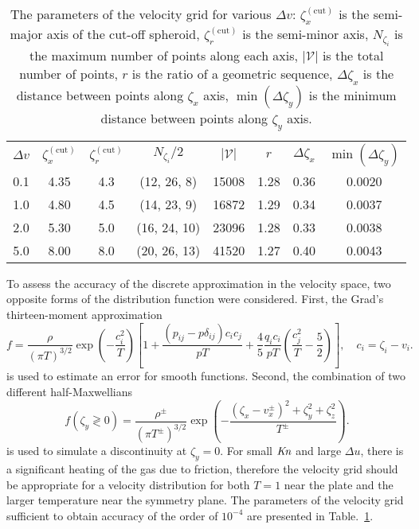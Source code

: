 \documentclass[review]{elsarticle}
\newcommand{\Kn}{\mbox{\textit{Kn}}}
\begin{document}
\begin{table}
    \centering
    \begin{tabular}{cccccccc}
        \(\Delta{v}\) & \(\zeta^{(\mathrm{cut})}_x\) & \(\zeta^{(\mathrm{cut})}_r\)
            & \(N_{\zeta_i}/2\) & \(|\mathcal{V}|\) & \(r\) & \(\Delta\zeta_x\) & \(\min(\Delta\zeta_y)\) \\[3pt]
        0.1 & 4.35 & 4.3 & (12, 26, 8)  & 15008 & 1.28 & 0.36 & 0.0020 \\
        1.0 & 4.80 & 4.5 & (14, 23, 9)  & 16872 & 1.29 & 0.34 & 0.0037 \\
        2.0 & 5.30 & 5.0 & (16, 24, 10) & 23096 & 1.28 & 0.33 & 0.0038 \\
        5.0 & 8.00 & 8.0 & (20, 26, 13) & 41520 & 1.27 & 0.40 & 0.0043 \\
    \end{tabular}
    \caption{The parameters of the velocity grid for various \(\Delta{v}\):
        \(\zeta^{(\mathrm{cut})}_x\) is the semi-major axis of the cut-off spheroid,
        \(\zeta^{(\mathrm{cut})}_r\) is the semi-minor axis,
        \(N_{\zeta_i}\) is the maximum number of points along each axis,
        \(|\mathcal{V}|\) is the total number of points,
        \(r\) is the ratio of a geometric sequence,
        \(\Delta\zeta_x\) is the distance between points along \(\zeta_x\) axis,
        \(\min(\Delta\zeta_y)\) is the minimum distance between points along \(\zeta_y\) axis.}
    \label{table:velocity_grid}
\end{table}

To assess the accuracy of the discrete approximation in the velocity space,
two opposite forms of the distribution function were considered.
First, the Grad's thirteen-moment approximation
\begin{equation}\label{eq:grad13}
    f = \frac{\rho}{(\pi T)^{3/2}}\exp\left(-\frac{c_i^2}{ T}\right)
    \left[ 1 + \frac{(p_{ij}-p\delta_{ij})c_ic_j}{pT} + \frac4{5}\frac{q_ic_i}{pT}\left(\frac{c_j^2}{T}-\frac5{2}\right) \right],
    \quad c_i = \zeta_i - v_i.
\end{equation}
is used to estimate an error for smooth functions.
Second, the combination of two different half-Maxwellians
\begin{equation}\label{eq:double_Maxwell}
    f(\zeta_y\gtrless0) = \frac{\rho^\pm}{(\pi T^\pm)^{3/2}}\exp\left(-\frac{(\zeta_x-v_x^\pm)^2+\zeta_y^2+\zeta_z^2}{T^\pm}\right).
\end{equation}
is used to simulate a discontinuity at \(\zeta_y=0\).
For small \(\Kn\) and large \(\Delta{u}\), there is a significant heating of the gas due to friction,
therefore the velocity grid should be appropriate for a velocity distribution
for both \(T=1\) near the plate and the larger temperature near the symmetry plane.
The parameters of the velocity grid sufficient to obtain accuracy of the order of \(10^{-4}\)
are presented in Table.~\ref{table:velocity_grid}.
\end{document}
